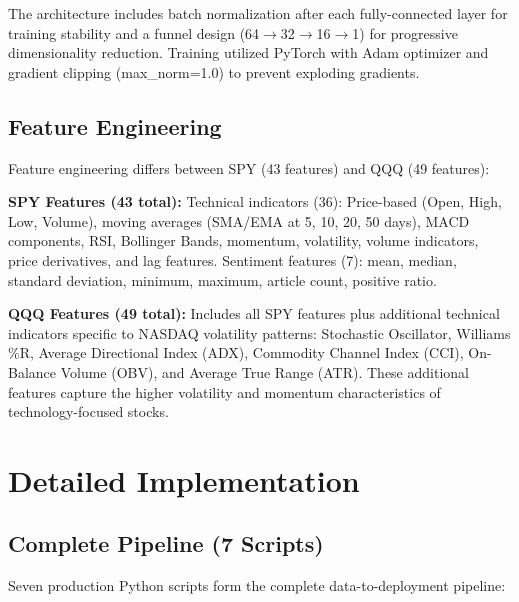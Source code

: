 \documentclass[12pt,letterpaper]{article}
\begin{document}
The architecture includes batch normalization after each fully-connected layer for training stability and a funnel design (64$\rightarrow$32$\rightarrow$16$\rightarrow$1) for progressive dimensionality reduction. Training utilized PyTorch with Adam optimizer and gradient clipping (max\_norm=1.0) to prevent exploding gradients.

\subsection{Feature Engineering}

Feature engineering differs between SPY (43 features) and QQQ (49 features):

\textbf{SPY Features (43 total):} Technical indicators (36): Price-based (Open, High, Low, Volume), moving averages (SMA/EMA at 5, 10, 20, 50 days), MACD components, RSI, Bollinger Bands, momentum, volatility, volume indicators, price derivatives, and lag features. Sentiment features (7): mean, median, standard deviation, minimum, maximum, article count, positive ratio.

\textbf{QQQ Features (49 total):} Includes all SPY features plus additional technical indicators specific to NASDAQ volatility patterns: Stochastic Oscillator, Williams \%R, Average Directional Index (ADX), Commodity Channel Index (CCI), On-Balance Volume (OBV), and Average True Range (ATR). These additional features capture the higher volatility and momentum characteristics of technology-focused stocks.

\section{Detailed Implementation}

\subsection{Complete Pipeline (7 Scripts)}

Seven production Python scripts form the complete data-to-deployment pipeline:
\end{document}
